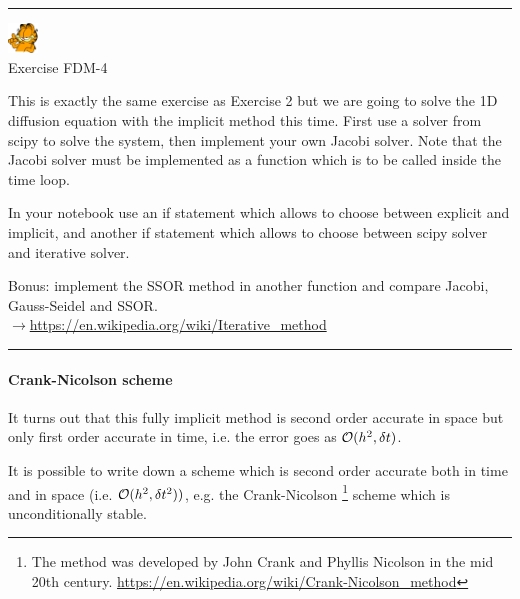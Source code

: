 \begin{center}
\begin{minipage}[t]{0.77\textwidth}
\par\noindent\rule{\textwidth}{0.4pt}

\begin{center}
\includegraphics[width=0.8cm]{images/garftr} \\
{\color{orange}Exercise FDM-4}
\end{center}

This is exactly the same exercise as Exercise 2 but we 
are going to solve the 1D diffusion equation with the implicit method
this time. First use a solver from scipy to solve the system, then 
implement your own Jacobi solver. Note that the Jacobi solver must be 
implemented as a function which is to be called inside the time loop.

In your notebook use an if statement which allows to choose between 
explicit and implicit, and another if statement which allows to choose 
between scipy solver and iterative solver. 

Bonus: implement the SSOR method in another function and compare Jacobi, Gauss-Seidel and SSOR.\\
$\rightarrow$\url{https://en.wikipedia.org/wiki/Iterative_method}

\par\noindent\rule{\textwidth}{0.4pt}
\end{minipage}
\end{center}


\paragraph{Crank-Nicolson scheme} 
It turns out that this fully implicit method is second order accurate in space but 
only first order accurate in time,
i.e. the error goes as ${\cal O}(h^2,\delta t)$.   

It is possible to write down a scheme which is second order accurate both in time and in space
(i.e. ${\cal O}(h^2, \delta t^2))$, e.g. the {\color{olive}Crank-Nicolson}
\footnote{
The method was developed by John Crank and Phyllis Nicolson 
in the mid 20th century. \url{https://en.wikipedia.org/wiki/Crank-Nicolson_method}
}
scheme which is unconditionally stable. 

